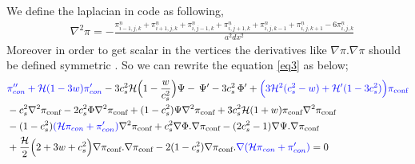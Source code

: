 \documentclass[a4paper,11pt]{article}
\begin{document}
We define the laplacian in code as following,
\begin{align}
& \nabla^2 \pi =-\frac{\pi^{n}_{i-1,j,k}+\pi^{n}_{i+1,j,k} +\pi^{n}_{i,j-1,k} +\pi^{n}_{i,j+1,k}+\pi^{n}_{i,j,k-1}+\pi^{n}_{i,j,k+1} -6 \pi^{n}_{i,j,k}  }{ a^2 dx^2}  
\end{align}
Moreover in order to get scalar in the vertices the derivatives like $\nabla \pi . \nabla \pi $ should be defined symmetric .
So we can rewrite the equation \ref{eq3} as below;
\begin{align} 
 &{\color{blue}\pi''_{con} +\mathcal{H}(1- 3w) \pi'_{con} } -3 { c_s^2 \mathcal{H}}\Big( 1- \frac{w}{c_s^2} \Big )\Psi - \, {\Psi'}- 3 c_s^2  \,{\Phi'} + {\color{blue}
 \Big( 3\mathcal{H}^2 (c_s^2 -w) + \mathcal{H}' (1-3c_s^2)\Big) \pi_{\text{conf}} }
           \nonumber
   \\
    &
 - c_s^2 {\nabla^2 \pi_{\text{conf}} }
     -2 c_s^2  \Phi  {\nabla^2 \pi_{\text{conf}} }  
  +   (1-c_s^2)  \Psi {\nabla^2 \pi_{\text{conf}} }
  +3 c_s^2 \mathcal{H} (1+w)\pi_{\text{conf}} {\nabla^2 \pi_{\text{conf}} }
                                      \nonumber
   \\
    &
        -   (1-c_s^2)  { \color{blue}(\mathcal{H} \pi_{con}+ \pi'_{con}) } \nabla^2 {\pi_{\text{conf}} }
             +c_s^2 {\nabla  \Phi . \nabla \pi_{\text{conf}} }
        -(2 c_s^2-1) {\nabla  \Psi . \nabla \pi_{\text{conf}} }  
                                    \nonumber
   \\
    &
 +\frac{\mathcal{H}} {2 } \Big(2+3w+c_s^2  \Big){\nabla  \pi_{\text{conf}} . \nabla \pi_{\text{conf}} } 
     -2   (1-c_s^2){\nabla  \pi_{\text{conf}} . {\color{blue}  \nabla {  (\mathcal{H} \pi_{con}+ \pi'_{con})   }}}     =0
  \end{align} 
\end{document}
